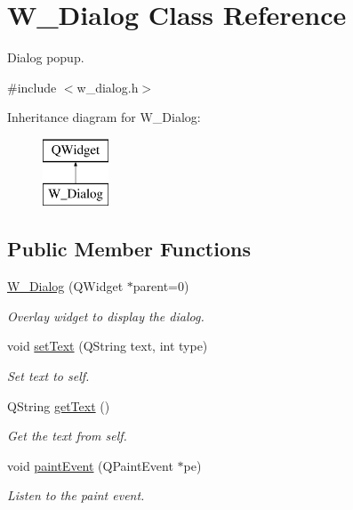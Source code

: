 \hypertarget{class_w___dialog}{}\section{W\+\_\+\+Dialog Class Reference}
\label{class_w___dialog}


Dialog popup.  




{\ttfamily \#include $<$w\+\_\+dialog.\+h$>$}

Inheritance diagram for W\+\_\+\+Dialog\+:\begin{figure}[H]
\begin{center}
\leavevmode
\includegraphics[height=2.000000cm]{class_w___dialog}
\end{center}
\end{figure}
\subsection*{Public Member Functions}
\begin{DoxyCompactItemize}
\item 
\hyperlink{class_w___dialog_a0781c87ca113e6e99f1228004308ce35}{W\+\_\+\+Dialog} (Q\+Widget $\ast$parent=0)
\begin{DoxyCompactList}\small\item\em Overlay widget to display the dialog. \end{DoxyCompactList}\item 
void \hyperlink{class_w___dialog_a720d81ba9f37cadb4d2c0f8669b87b9d}{set\+Text} (Q\+String text, int type)
\begin{DoxyCompactList}\small\item\em Set text to self. \end{DoxyCompactList}\item 
Q\+String \hyperlink{class_w___dialog_af944a68703c890ea23579555d0cbb56d}{get\+Text} ()
\begin{DoxyCompactList}\small\item\em Get the text from self. \end{DoxyCompactList}\item 
void \hyperlink{class_w___dialog_a1c77200dd49808733f09d92b5f1fea6a}{paint\+Event} (Q\+Paint\+Event $\ast$pe)
\begin{DoxyCompactList}\small\item\em Listen to the paint event. \end{DoxyCompactList}\end{DoxyCompactItemize}


